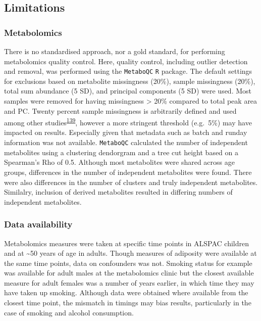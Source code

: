 \documentclass[11pt,twoside]{bristolthesis}
\begin{document}
\hypertarget{limitations}{%
\subsection{Limitations}\label{limitations}}

\hypertarget{metabolomics}{%
\subsubsection{Metabolomics}\label{metabolomics}}

There is no standardised approach, nor a gold standard, for performing metabolomics quality control. Here, quality control, including outlier detection and removal, was performed using the \texttt{MetaboQC} \texttt{R} package. The default settings for exclusions based on metabolite missingness (20\%), sample missingness (20\%), total sum abundance (5 SD), and principal components (5 SD) were used. Most samples were removed for having missingness \textgreater{} 20\% compared to total peak area and PC. Twenty percent sample missingness is arbitrarily defined and used among other studies\textsuperscript{\protect\hyperlink{ref-Lotta2020}{139}}, however a more stringent threshold (e.g.~5\%) may have impacted on results. Especially given that metadata such as batch and runday information was not available. \texttt{MetaboQC} calculated the number of independent metabolites using a clustering dendorgram and a tree cut height based on a Spearman's Rho of 0.5. Although most metabolites were shared across age groups, differences in the number of independent metabolites were found. There were also differences in the number of clusters and truly independent metabolites. Similalry, inclusion of derived metabolites resulted in differing numbers of independent metabolites.

\hypertarget{data-availability}{%
\subsubsection{Data availability}\label{data-availability}}

Metabolomics measures were taken at specific time points in ALSPAC children and at \textasciitilde{}50 years of age in adults. Though measures of adiposity were available at the same time points, data on confounders was not. Smoking status for example was available for adult males at the metabolomics clinic but the closest available measure for adult females was a number of years earlier, in which time they may have taken up smoking. Although data were obtained where available from the closest time point, the mismatch in timings may bias results, particularly in the case of smoking and alcohol consumption.
\end{document}
